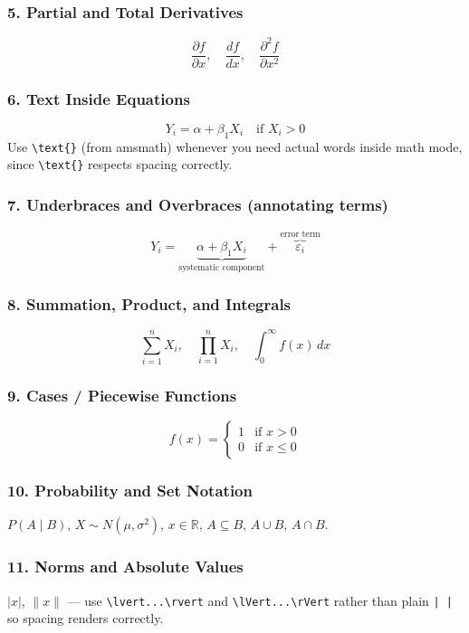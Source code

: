 \subsubsection*{5. Partial and Total Derivatives}
\[
\frac{\partial f}{\partial x}, \quad \frac{d f}{d x}, \quad \frac{\partial^2 f}{\partial x^2}
\]

\subsubsection*{6. Text Inside Equations}
\[
Y_i = \alpha + \beta_1 X_i \quad \text{if } X_i > 0
\]
Use \verb|\text{}| (from amsmath) whenever you need actual words inside math mode, since \verb|\text{}| respects spacing correctly.

\subsubsection*{7. Underbraces and Overbraces (annotating terms)}
\[
Y_i = \underbrace{\alpha + \beta_1 X_i}_{\text{systematic component}} + \overbrace{\varepsilon_i}^{\text{error term}}
\]

\subsubsection*{8. Summation, Product, and Integrals}
\[
\sum_{i=1}^{n} X_i, \quad \prod_{i=1}^{n} X_i, \quad \int_{0}^{\infty} f(x)\,dx
\]

\subsubsection*{9. Cases / Piecewise Functions}
\[
f(x) =
\begin{cases}
    1 & \text{if } x > 0 \\
    0 & \text{if } x \leq 0
\end{cases}
\]

\subsubsection*{10. Probability and Set Notation}
\(P(A \mid B)\), \(X \sim N(\mu, \sigma^2)\), \(x \in \mathbb{R}\), \(A \subseteq B\), \(A \cup B\), \(A \cap B\).

\subsubsection*{11. Norms and Absolute Values}
\(\lvert x \rvert\), \(\lVert x \rVert\) --- use \verb|\lvert...\rvert| and \verb|\lVert...\rVert| rather than plain \verb!| |! so spacing renders correctly.

